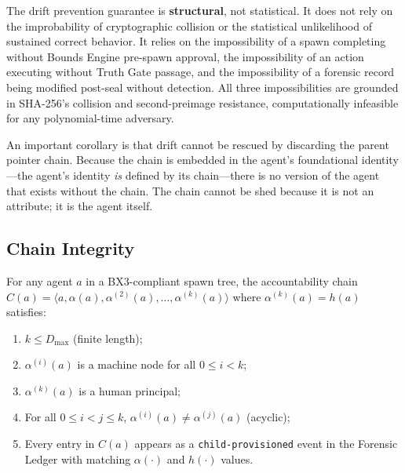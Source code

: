 The drift prevention guarantee is \textbf{structural}, not statistical. It does not rely on the improbability of cryptographic collision or the statistical unlikelihood of sustained correct behavior. It relies on the impossibility of a spawn completing without Bounds Engine pre-spawn approval, the impossibility of an action executing without Truth Gate passage, and the impossibility of a forensic record being modified post-seal without detection. All three impossibilities are grounded in SHA-256's collision and second-preimage resistance, computationally infeasible for any polynomial-time adversary.

An important corollary is that drift cannot be rescued by discarding the parent pointer chain. Because the chain is embedded in the agent's foundational identity---the agent's identity \emph{is} defined by its chain---there is no version of the agent that exists without the chain. The chain cannot be shed because it is not an attribute; it is the agent itself.

\subsection{Chain Integrity}

\begin{property}
\label{prop:chain-integrity}
For any agent $a$ in a BX3-compliant spawn tree, the accountability chain
$C(a) = \langle a, \alpha(a), \alpha^{(2)}(a), \ldots, \alpha^{(k)}(a) \rangle$
where $\alpha^{(k)}(a) = h(a)$ satisfies:
\begin{enumerate}
  \item $k \leq D_{\max}$ (finite length);
  \item $\alpha^{(i)}(a)$ is a machine node for all $0 \leq i < k$;
  \item $\alpha^{(k)}(a)$ is a human principal;
  \item For all $0 \leq i < j \leq k$, $\alpha^{(i)}(a) \neq \alpha^{(j)}(a)$ (acyclic);
  \item Every entry in $C(a)$ appears as a \texttt{child-provisioned} event in the Forensic Ledger with matching $\alpha(\cdot)$ and $h(\cdot)$ values.
\end{enumerate}
\end{property}

